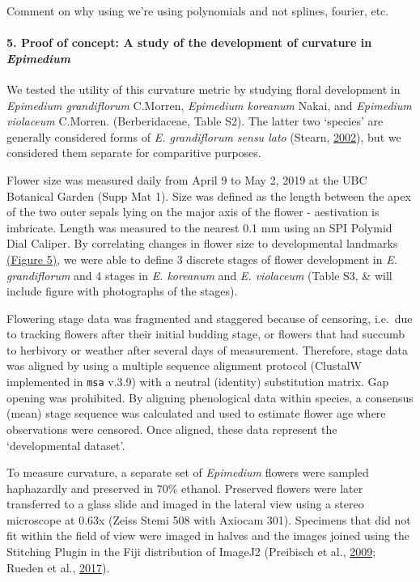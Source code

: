 \documentclass[]{article}
\let\oldparagraph\paragraph
\renewcommand{\paragraph}[1]{\oldparagraph{#1}\mbox{}}
\begin{document}
Comment on why using we're using polynomials and not splines, fourier,
etc.

\hypertarget{proof-of-concept-a-study-of-the-development-of-curvature-in-epimedium}{%
\paragraph{\texorpdfstring{5. Proof of concept: A study of the
development of curvature in
\emph{Epimedium}}{5. Proof of concept: A study of the development of curvature in Epimedium}}\label{proof-of-concept-a-study-of-the-development-of-curvature-in-epimedium}}

We tested the utility of this curvature metric by studying floral
development in \emph{Epimedium grandiflorum} C.Morren, \emph{Epimedium
koreanum} Nakai, and \emph{Epimedium violaceum} C.Morren.
(Berberidaceae, Table S2). The latter two `species' are generally
considered forms of \emph{E. grandiflorum sensu lato} (Stearn,
\protect\hyperlink{ref-stearn_2002}{2002}), but we considered them
separate for comparitive purposes.

Flower size was measured daily from April 9 to May 2, 2019 at the UBC
Botanical Garden (Supp Mat 1). Size was defined as the length between
the apex of the two outer sepals lying on the major axis of the flower -
aestivation is imbricate. Length was measured to the nearest 0.1 mm
using an SPI Polymid Dial Caliper. By correlating changes in flower size
to developmental landmarks \href{Figures/Figure_5.jpeg}{(Figure 5)}, we
were able to define 3 discrete stages of flower development in \emph{E.
grandiflorum} and 4 stages in \emph{E. koreanum} and \emph{E. violaceum}
(Table S3, \& will include figure with photographs of the stages).

Flowering stage data was fragmented and staggered because of censoring,
i.e.~due to tracking flowers after their initial budding stage, or
flowers that had succumb to herbivory or weather after several days of
measurement. Therefore, stage data was aligned by using a multiple
sequence alignment protocol (ClustalW implemented in \texttt{msa} v.3.9)
with a neutral (identity) substitution matrix. Gap opening was
prohibited. By aligning phenological data within species, a consensus
(mean) stage sequence was calculated and used to estimate flower age
where observations were censored. Once aligned, these data represent the
`developmental dataset'.

To measure curvature, a separate set of \emph{Epimedium} flowers were
sampled haphazardly and preserved in 70\% ethanol. Preserved flowers
were later transferred to a glass slide and imaged in the lateral view
using a stereo microscope at 0.63x (Zeiss Stemi 508 with Axiocam 301).
Specimens that did not fit within the field of view were imaged in
halves and the images joined using the Stitching Plugin in the Fiji
distribution of ImageJ2 (Preibisch et al.,
\protect\hyperlink{ref-preibisch_2009}{2009}; Rueden et al.,
\protect\hyperlink{ref-rueden_2017}{2017}).
\end{document}
